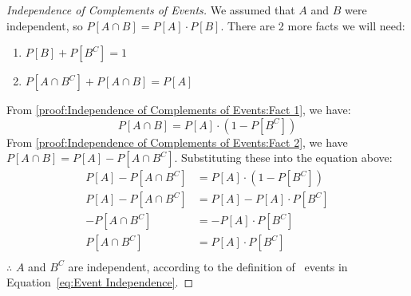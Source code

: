 		\begin{proof}[Independence of Complements of Events] \label{proof:Independence of Complements of Events}
			We assumed that $A$ and $B$ were independent, so $P \left[ A \cap B \right] = P \left[ A \right] \cdot P \left[ B \right]$.
			There are 2 more facts we will need:
			\begin{enumerate}[leftmargin=1.0in, label=Fact \arabic*: , ref=Fact \arabic*, noitemsep, nolistsep]
				\item $P \left[ B \right] + P \left[ B^{C} \right] = 1$ \label{proof:Independence of Complements of Events:Fact 1}
				\item $P \left[ A \cap B^{C} \right] + P \left[ A \cap B \right] = P \left[ A \right]$ \label{proof:Independence of Complements of Events:Fact 2}
			\end{enumerate}
			From \ref{proof:Independence of Complements of Events:Fact 1}, we have:
			\begin{equation*}
				P \left[ A \cap B \right] = P \left[ A \right] \cdot \left( 1-P \left[ B^{C} \right] \right)
			\end{equation*}
			From \ref{proof:Independence of Complements of Events:Fact 2}, we have $P \left[ A \cap B \right] = P \left[ A \right] - P \left[ A \cap B^{C} \right]$.
			Substituting these into the equation above:
			\begin{align*}
				P \left[ A \right] - P \left[ A \cap B^{C} \right] &= P \left[ A \right] \cdot \left( 1-P \left[ B^{C} \right] \right)\\
				P \left[ A \right] - P \left[ A \cap B^{C} \right] &= P \left[ A \right] - P \left[ A \right] \cdot P \left[ B^{C} \right] \\
				- P \left[ A \cap B^{C} \right] &= -P \left[ A \right] \cdot P \left[ B^{C} \right] \\
				P \left[ A \cap B^{C} \right] &= P \left[ A \right] \cdot P \left[ B^{C} \right] \\
			\end{align*}
			$\therefore$ $A$ and $B^{C}$ are independent, according to the definition of ~events in Equation~\eqref{eq:Event Independence}.
		\end{proof}